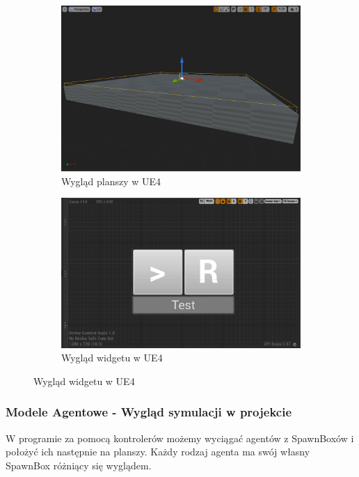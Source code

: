 \documentclass[a4paper,12pt,reqno]{article}
\begin{document}
\begin{figure}[H]%
	\centering
	\begin{subfigure}{.5\textwidth}
		\centering
		\includegraphics[width=0.8\linewidth]{graphics//agent/BP_AgentTable.png}
		\caption{Wygląd planszy w UE4}	
		\label{ref:subref_a}
	\end{subfigure}%
	\begin{subfigure}{.5\textwidth}
		\centering
		\includegraphics[width=0.8\linewidth]{graphics//agent/BP_AgentControl.png}
		\caption{Wygląd widgetu w UE4}
		\label{ref:subref_b}
	\end{subfigure}%
\label{ref:ref}
\end{figure}

\subsubsection{Modele Agentowe - Wygląd symulacji w projekcie}
W programie za pomocą kontrolerów możemy wyciągać agentów z SpawnBoxów i położyć ich następnie na planszy. Każdy rodzaj agenta ma swój własny SpawnBox różniący się wyglądem.
\end{document}
